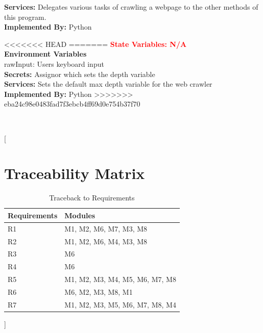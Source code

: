 \documentclass[titlepage]{article}
\newcommand{\group}[1]{{\leavevmode\color{red}[#1]}}
\begin{document}
{\textbf{Services:}
Delegates various tasks of crawling a webpage to the other methods of this program.\\

\textbf{Implemented By:}
Python


<<<<<<< HEAD
=======
\textcolor{red}{\textbf{State Variables: N/A}}\\

\textbf{Environment Variables}\\
rawInput: Users keyboard input\\

\textbf{Secrets:}
Assignor which sets the depth variable\\

\textbf{Services:}
Sets the default max depth variable for the web crawler\\

\textbf{Implemented By:}
Python
>>>>>>> eba24c98e0483fad7f3ebcb4ff69d0e754b37f70

}
\\
    \group{
\section{Traceability Matrix}
\begin{table}[h!]
\centering
    \begin{tabular}{| p{5cm} | p{5cm} |}    \hline
    Requirements &Modules\\ \hline

      R1  &M1, M2, M6, M7, M3, M8\\ \hline
      R2  &M1, M2, M6, M4, M3, M8 \\ \hline
      R3  &M6 \\ \hline
      R4  &M6 \\ \hline
      R5  &M1, M2, M3, M4, M5, M6, M7, M8 \\ \hline
      R6  &M6, M2, M3, M8, M1 \\ \hline
      R7  &M1, M2, M3, M5, M6, M7, M8, M4 \\ \hline
      
    \end{tabular}
    \caption{Traceback to Requirements}
\label{table:Traceback to Requirements}
\end{table}
}
\end{document}
